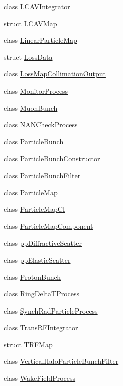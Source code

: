 \begin{DoxyCompactItemize}
class \hyperlink{classParticleTracking_1_1LCAVIntegrator}{L\+C\+A\+V\+Integrator}
\item 
struct \hyperlink{structParticleTracking_1_1LCAVMap}{L\+C\+A\+V\+Map}
\item 
class \hyperlink{classParticleTracking_1_1LinearParticleMap}{Linear\+Particle\+Map}
\item 
struct \hyperlink{structParticleTracking_1_1LossData}{Loss\+Data}
\item 
class \hyperlink{classParticleTracking_1_1LossMapCollimationOutput}{Loss\+Map\+Collimation\+Output}
\item 
class \hyperlink{classParticleTracking_1_1MonitorProcess}{Monitor\+Process}
\item 
class \hyperlink{classParticleTracking_1_1MuonBunch}{Muon\+Bunch}
\item 
class \hyperlink{classParticleTracking_1_1NANCheckProcess}{N\+A\+N\+Check\+Process}
\item 
class \hyperlink{classParticleTracking_1_1ParticleBunch}{Particle\+Bunch}
\item 
class \hyperlink{classParticleTracking_1_1ParticleBunchConstructor}{Particle\+Bunch\+Constructor}
\item 
class \hyperlink{classParticleTracking_1_1ParticleBunchFilter}{Particle\+Bunch\+Filter}
\item 
class \hyperlink{classParticleTracking_1_1ParticleMap}{Particle\+Map}
\item 
class \hyperlink{classParticleTracking_1_1ParticleMapCI}{Particle\+Map\+CI}
\item 
class \hyperlink{classParticleTracking_1_1ParticleMapComponent}{Particle\+Map\+Component}
\item 
class \hyperlink{classParticleTracking_1_1ppDiffractiveScatter}{pp\+Diffractive\+Scatter}
\item 
class \hyperlink{classParticleTracking_1_1ppElasticScatter}{pp\+Elastic\+Scatter}
\item 
class \hyperlink{classParticleTracking_1_1ProtonBunch}{Proton\+Bunch}
\item 
class \hyperlink{classParticleTracking_1_1RingDeltaTProcess}{Ring\+Delta\+T\+Process}
\item 
class \hyperlink{classParticleTracking_1_1SynchRadParticleProcess}{Synch\+Rad\+Particle\+Process}
\item 
class \hyperlink{classParticleTracking_1_1TransRFIntegrator}{Trans\+R\+F\+Integrator}
\item 
struct \hyperlink{structParticleTracking_1_1TRFMap}{T\+R\+F\+Map}
\item 
class \hyperlink{classParticleTracking_1_1VerticalHaloParticleBunchFilter}{Vertical\+Halo\+Particle\+Bunch\+Filter}
\item 
class \hyperlink{classParticleTracking_1_1WakeFieldProcess}{Wake\+Field\+Process}
\end{DoxyCompactItemize}
